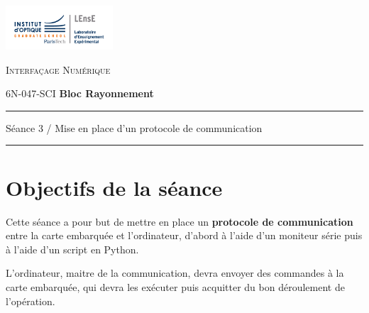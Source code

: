 \documentclass[a4paper,11pt,titlepage]{article} %
\begin{document}
\cleardoublepage
\strut %

\begin{minipage}[c]{.25\linewidth}
	\includegraphics[width=4cm]{images/Logo-LEnsE.png}
\end{minipage} \hfill
\begin{minipage}[c]{.4\linewidth}

\begin{center}
\vspace{0.3cm}
{\Large \textsc{Interfaçage Numérique}}

\medskip

6N-047-SCI \qquad \textbf{\large Bloc Rayonnement}

\end{center}
\end{minipage}\hfill

\vspace{0.5cm}

\noindent \rule{\linewidth}{1pt}

{\noindent\Large \rule[-7pt]{0pt}{30pt} Séance 3 / Mise en place d'un protocole de communication} 

\noindent \rule{\linewidth}{1pt}


\section{Objectifs de la séance}

Cette séance a pour but de mettre en place un \textbf{protocole de communication} entre la carte embarquée et l'ordinateur, d'abord à l'aide d'un moniteur série puis à l'aide d'un script en Python.

L'ordinateur, maitre de la communication, devra envoyer des commandes à la carte embarquée, qui devra les exécuter puis acquitter du bon déroulement de l'opération.
\end{document}
